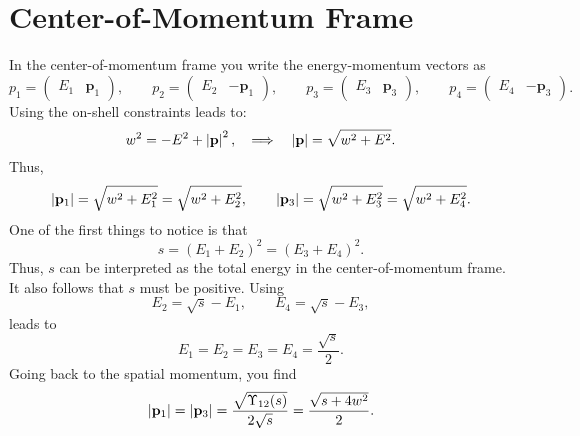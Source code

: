\section{Center-of-Momentum Frame}
In the center-of-momentum frame you write the energy-momentum vectors as
\begin{equation}
	p_{1} = \begin{pmatrix} E_{1} & \mathbf{p}_{1} \end{pmatrix}, \qquad p_{2} = \begin{pmatrix} E_{2} & -\mathbf{p}_{1} \end{pmatrix}, \qquad p_{3} = \begin{pmatrix} E_{3} & \mathbf{p}_{3} \end{pmatrix}, \qquad p_{4} = \begin{pmatrix} E_{4} & -\mathbf{p}_{3} \end{pmatrix}.
\end{equation}
Using the on-shell constraints leads to:
\begin{equation}
	w^{2} = -E^{2} + \left\lvert \mathbf{p} \right\rvert^{2}, \quad \Longrightarrow \quad \left\lvert \mathbf{p} \right\rvert = \sqrt{w^{2} + E^{2}}.
\end{equation}
Thus,
\begin{equation}
	\left\lvert \mathbf{p}_{1} \right\rvert = \sqrt{w^{2} + E_{1}^{2}} = \sqrt{w^{2} + E_{2}^{2}}, \qquad \left\lvert \mathbf{p}_{3} \right\rvert = \sqrt{w^{2} + E_{3}^{2}} = \sqrt{w^{2} + E_{4}^{2}}.
\end{equation}
One of the first things to notice is that
\begin{equation}
	s = (E_{1} + E_{2})^{2} = (E_{3} + E_{4})^{2}.
\end{equation}
Thus, $s$ can be interpreted as the total energy in the center-of-momentum frame. It also follows that $s$ must be positive. Using
\begin{equation}
	E_{2} = \sqrt{s} - E_{1}, \qquad E_{4} = \sqrt{s} - E_{3},
\end{equation}
leads to
\begin{equation}
	E_{1} = E_{2} = E_{3} = E_{4} = \frac{\sqrt{s}}{2}.
\end{equation}
Going back to the spatial momentum, you find
\begin{equation}
	\left\lvert \mathbf{p}_{1} \right\rvert = \left\lvert \mathbf{p}_{3} \right\rvert = \frac{\sqrt{\Upsilon_{12}(s)}}{2 \sqrt{s}} = \frac{\sqrt{s + 4 w^{2}}}{2}.
\end{equation}
